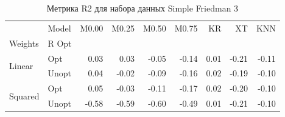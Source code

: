 \begin{table}
\caption{Метрика R2 для набора данных Simple Friedman 3}
\label{tab:R2_Simple Friedman 3}
\begin{tabular}{llrrrrrrr}
\toprule
 & Model & M0.00 & M0.25 & M0.50 & M0.75 & KR & XT & KNN \\
Weights & R Opt &  &  &  &  &  &  &  \\
\midrule
\multirow[t]{2}{*}{Linear} & Opt & 0.03 & 0.03 & -0.05 & -0.14 & 0.01 & -0.21 & -0.11 \\
 & Unopt & 0.04 & -0.02 & -0.09 & -0.16 & 0.02 & -0.19 & -0.10 \\

\multirow[t]{2}{*}{Squared} & Opt & 0.05 & -0.03 & -0.11 & -0.17 & 0.02 & -0.20 & -0.10 \\
 & Unopt & -0.58 & -0.59 & -0.60 & -0.49 & 0.01 & -0.21 & -0.10 \\

\bottomrule
\end{tabular}
\end{table}
